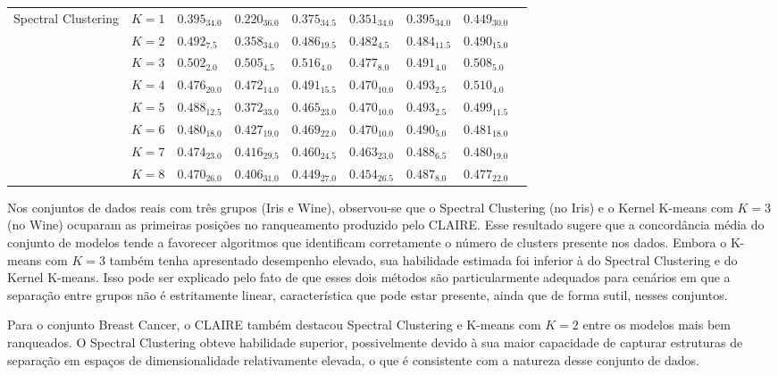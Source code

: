 \begin{table}[!t]
\begin{tabular}{l|c|lllllll}
\midrule
\multirow[t]{8}{*}{Spectral Clustering} & $K=1$ & $0.395_{34.0}$ & $0.220_{36.0}$ & $0.375_{34.5}$ & $0.351_{34.0}$ & $0.395_{34.0}$ & $0.449_{30.0}$ \\
 & $K=2$ & $0.492_{7.5}$ & $0.358_{34.0}$ & $0.486_{19.5}$ & $\mathbf{0.482_{4.5}}$ & $0.484_{11.5}$ & $0.490_{15.0}$ \\
 & $K=3$ & $\mathbf{0.502_{2.0}}$ & $\mathbf{0.505_{4.5}}$ & $0.516_{4.0}$ & $0.477_{8.0}$ & $0.491_{4.0}$ & $0.508_{5.0}$ \\
 & $K=4$ & $0.476_{20.0}$ & $0.472_{14.0}$ & $0.491_{15.5}$ & $0.470_{10.0}$ & $\mathbf{0.493_{2.5}}$ & $0.510_{4.0}$ \\
 & $K=5$ & $0.488_{12.5}$ & $0.372_{33.0}$ & $0.465_{23.0}$ & $0.470_{10.0}$ & $\mathbf{0.493_{2.5}}$ & $0.499_{11.5}$ \\
 & $K=6$ & $0.480_{18.0}$ & $0.427_{19.0}$ & $0.469_{22.0}$ & $0.470_{10.0}$ & $0.490_{5.0}$ & $0.481_{18.0}$ \\
 & $K=7$ & $0.474_{23.0}$ & $0.416_{29.5}$ & $0.460_{24.5}$ & $0.463_{23.0}$ & $0.488_{6.5}$ & $0.480_{19.0}$ \\
 & $K=8$ & $0.470_{26.0}$ & $0.406_{31.0}$ & $0.449_{27.0}$ & $0.454_{26.5}$ & $0.487_{8.0}$ & $0.477_{22.0}$ \\
\midrule
\end{tabular}
\label{tab:abilities_aniso_blobs_varied_moons_circles_no_structure}
\end{table}

Nos conjuntos de dados reais com três grupos (Iris e Wine), observou-se que o Spectral Clustering (no Iris) e o Kernel K-means com $K=3$ (no Wine) ocuparam as primeiras posições no ranqueamento produzido pelo \gls{CLAIRE}. Esse resultado sugere que a concordância média do conjunto de modelos tende a favorecer algoritmos que identificam corretamente o número de clusters presente nos dados. Embora o K-means com $K=3$ também tenha apresentado desempenho elevado, sua habilidade estimada foi inferior à do Spectral Clustering e do Kernel K-means. Isso pode ser explicado pelo fato de que esses dois métodos são particularmente adequados para cenários em que a separação entre grupos não é estritamente linear, característica que pode estar presente, ainda que de forma sutil, nesses conjuntos.

Para o conjunto Breast Cancer, o \gls{CLAIRE} também destacou Spectral Clustering e K-means com $K=2$ entre os modelos mais bem ranqueados. O Spectral Clustering obteve habilidade superior, possivelmente devido à sua maior capacidade de capturar estruturas de separação em espaços de dimensionalidade relativamente elevada, o que é consistente com a natureza desse conjunto de dados.

